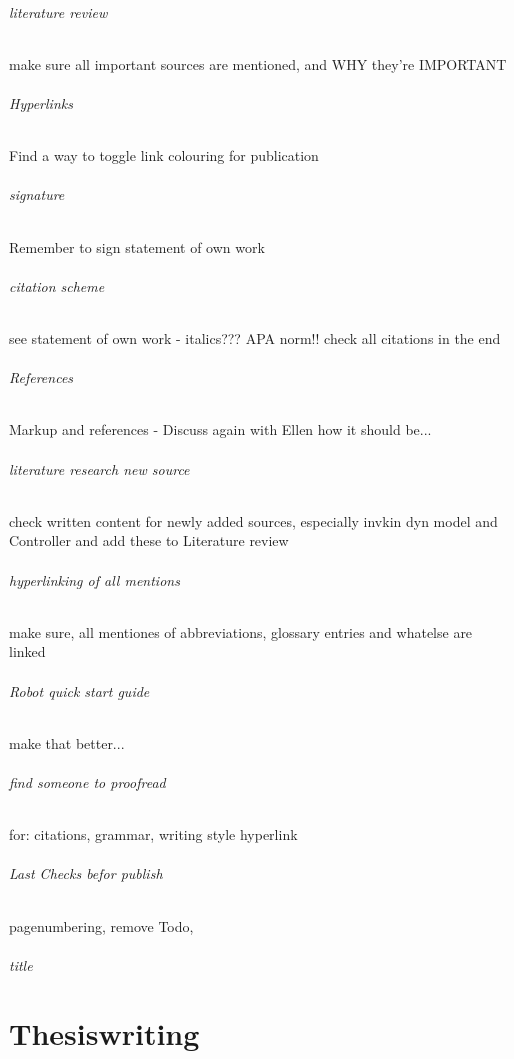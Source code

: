 \paragraph{literature review}
make sure all important sources are mentioned, and WHY they're IMPORTANT

\paragraph{Hyperlinks}
Find a way to toggle link colouring for publication

\paragraph{signature}
Remember to sign statement of own work

\paragraph{citation scheme}
see statement of own work - italics???
APA norm!! check all citations in the end
\paragraph{References}
Markup and references - Discuss again with Ellen how it should be...

\paragraph{literature research new source}
check written content for newly added sources, especially invkin dyn model and Controller and add these to Literature review

\paragraph{hyperlinking of all mentions}
make sure, all mentiones of abbreviations, glossary entries and whatelse are linked

\paragraph{Robot quick start guide}
make that better...

\paragraph{find someone to proofread}
for:
citations,
grammar,
writing style
hyperlink

\paragraph{Last Checks befor publish}
pagenumbering,
remove Todo,

\paragraph{title}


\cleardoublepage
\part{Thesiswriting}
\cleardoublepage
